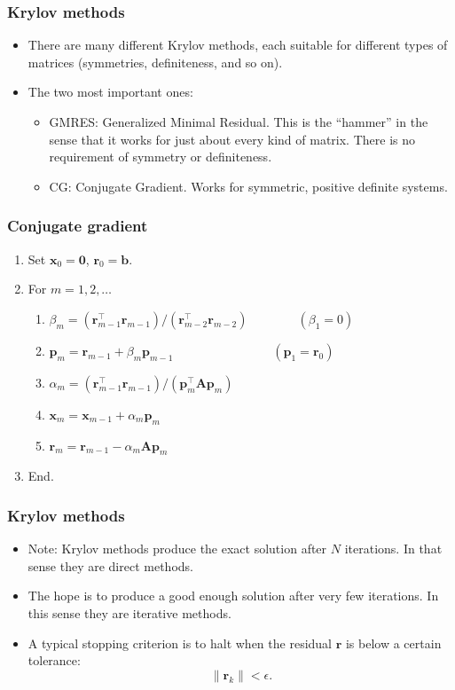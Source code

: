 \begin{frame}
  \frametitle{Krylov methods}
  \begin{itemize}
  \item There are many different Krylov methods, each suitable for different
    types of matrices (symmetries, definiteness, and so on).
  \item The two most important ones:
    \begin{itemize}
    \item GMRES: Generalized Minimal Residual. This is the ``hammer'' in the
      sense that it works for just about every kind of matrix. There is no
      requirement of symmetry or definiteness.
    \item CG: Conjugate Gradient. Works for symmetric, positive definite
      systems.
    \end{itemize}
  \end{itemize}
\end{frame}

\begin{frame}
  \frametitle{Conjugate gradient}
  \begin{enumerate}
  \item Set $\bm x_0 = \bm 0$, $\bm r_0 = \bm b$.
  \item For $m = 1,2,\ldots$
    \begin{enumerate}
    \item
      $\beta_m = \left( \bm r_{m-1}^\intercal \bm r_{m-1} \right) /
      \left(\bm r_{m-2}^\intercal \bm r_{m-2} \right)
      \qquad \qquad (\beta_1 = 0)$
    \item
      $\bm p_m = \bm r_{m-1} + \beta_m \bm p_{m-1}
      \qquad \qquad \qquad \qquad (\bm p_1 = \bm r_0)$
    \item
      $\alpha_m = \left( \bm r_{m-1}^\intercal \bm r_{m-1} \right) /
      \left( \bm p_m^\intercal \bm A \bm p_m \right)$
    \item $\bm x_m = \bm x_{m-1} + \alpha_m \bm p_m$
    \item $\bm r_m = \bm r_{m-1} - \alpha_m \bm A \bm p_m$
    \end{enumerate}
  \item End.
  \end{enumerate}
\end{frame}

\begin{frame}
  \frametitle{Krylov methods}
  \begin{itemize}
  \item Note: Krylov methods produce the exact solution after $N$ iterations. In
    that sense they are direct methods.
  \item The hope is to produce a good enough solution after very few iterations.
    In this sense they are iterative methods.
  \item A typical stopping criterion is to halt when the residual $\bm r$ is
    below a certain tolerance:
    \[
      \| \bm r_k \| < \epsilon.
    \]
  \end{itemize}
\end{frame}

